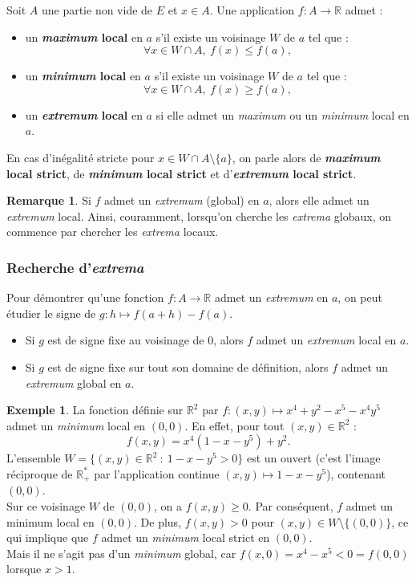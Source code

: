 \documentclass[french]{article}
\newcommand{\R}{\mathbb{R}}
\newcommand{\st}{^*}
\theoremstyle{plain}
\theoremstyle{definition}
\newtheorem*{ex}{Exemple}
\newtheorem*{rmq}{Remarque}
\theoremstyle{remark}
\begin{document}
\begin{dfn}
	Soit $A$ une partie non vide de $E$ et $x\in A$. Une application $f:A\to\R$ admet :
	\begin{itemize}
		\item un \textbf{\textit{maximum} local} en $a$ s'il existe un voisinage $W$ de $a$ tel que :
		$$\forall x\in W\cap A,\ f(x)\leqslant f(a),$$
		\item un \textbf{\textit{minimum} local} en $a$ s'il existe un voisinage $W$ de $a$ tel que :
		$$\forall x\in W\cap A,\ f(x)\geqslant f(a),$$
		\item un \textbf{\textit{extremum} local} en $a$ si elle admet un \textit{maximum} ou un \textit{minimum} local en $a$.
	\end{itemize}
	En cas d'inégalité stricte pour $x\in W\cap A\setminus\{a\}$, on parle alors de \textbf{\textit{maximum} local strict}, de \textbf{\textit{minimum} local strict} et d'\textbf{\textit{extremum} local strict}.
\end{dfn}

\begin{rmq}
	Si $f$ admet un \textit{extremum} (global) en $a$, alors elle admet un \textit{extremum} local. Ainsi, couramment, lorsqu'on cherche les \textit{extrema} globaux, on commence par chercher les \textit{extrema} locaux.
\end{rmq}

\subsubsection*{Recherche d'\textit{extrema}}

\begin{met}
	Pour démontrer qu'une fonction $f:A\to\R$ admet un \textit{extremum} en $a$, on peut étudier le signe de $g:h\mapsto f(a+h)-f(a)$.
	\begin{itemize}
		\item Si $g$ est de signe fixe au voisinage de $0$, alors $f$ admet un \textit{extremum} local en $a$.
		\item Si $g$ est de signe fixe sur tout son domaine de définition, alors $f$ admet un \textit{extremum} global en $a$.
	\end{itemize}
\end{met}

\begin{ex}
	La fonction définie sur $\R^2$ par $f:(x,y)\mapsto x^4+y^2-x^5-x^4y^5$ admet un \textit{minimum} local en $(0,0)$. En effet, pour tout $(x,y)\in\R^2$ :
	$$f(x,y)=x^4(1-x-y^5)+y^2.$$
	L'ensemble $W=\{(x,y)\in\R^2\ :\ 1-x-y^5>0\}$ est un ouvert (c'est l'image réciproque de $\R_+\st$ par l'application continue $(x,y)\mapsto1-x-y^5$), contenant $(0,0)$. \\
	Sur ce voisinage $W$ de $(0,0)$, on a $f(x,y)\geqslant0$. Par conséquent, $f$ admet un minimum local en $(0,0)$. De plus, $f(x,y)>0$ pour $(x,y)\in W\setminus\{(0,0)\}$, ce qui implique que $f$ admet un \textit{minimum} local strict en $(0,0)$.\\
	Mais il ne s'agit pas d'un \textit{minimum} global, car $f(x,0)=x^4-x^5<0=f(0,0)$ lorsque $x>1$.
\end{ex}
\end{document}
